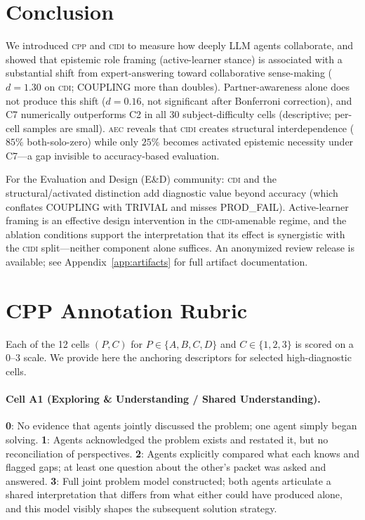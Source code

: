\documentclass{article}
\newcommand{\CDI}{\textsc{cdi}}
\newcommand{\CPP}{\textsc{cpp}}
\newcommand{\CIDI}{\textsc{cidi}}
\newcommand{\AEC}{\textsc{aec}}
\begin{document}
\section{Conclusion}
\label{sec:conclusion}

We introduced \CPP{} and \CIDI{} to measure how deeply LLM agents
collaborate, and showed that epistemic role framing (active-learner stance) is associated
with a substantial shift from expert-answering toward collaborative
sense-making ($d = 1.30$ on \CDI; COUPLING more than doubles). Partner-awareness
alone does not produce this shift ($d = 0.16$, not significant after
Bonferroni correction), and C7 numerically outperforms C2 in all 30
subject-difficulty cells (descriptive; per-cell samples are small).
\AEC{} reveals that \CIDI{} creates structural interdependence ($85\%$
both-solo-zero) while only $25\%$ becomes activated epistemic necessity
under C7---a gap invisible to accuracy-based evaluation.

For the Evaluation and Design (E\&D) community: \CDI{} and the structural/activated distinction add diagnostic value beyond accuracy (which conflates COUPLING with TRIVIAL and misses PROD\_FAIL). Active-learner framing is an effective design intervention in the \CIDI-amenable regime, and the ablation conditions support the interpretation that its effect is synergistic with the \CIDI{} split---neither component alone suffices.
An anonymized review release is available; see Appendix~\ref{app:artifacts} for full artifact documentation.

\clearpage



\appendix

\section{CPP Annotation Rubric}
\label{app:rubric}

Each of the 12 cells $(P, C)$ for $P \in \{A, B, C, D\}$ and
$C \in \{1, 2, 3\}$ is scored on a 0--3 scale. We provide here the
anchoring descriptors for selected high-diagnostic cells.

\paragraph{Cell A1 (Exploring \& Understanding / Shared Understanding).}
\textbf{0}: No evidence that agents jointly discussed the problem;
one agent simply began solving. \textbf{1}: Agents acknowledged the
problem exists and restated it, but no reconciliation of perspectives.
\textbf{2}: Agents explicitly compared what each knows and flagged
gaps; at least one question about the other's packet was asked and
answered. \textbf{3}: Full joint problem model constructed; both
agents articulate a shared interpretation that differs from what
either could have produced alone, and this model visibly shapes the
subsequent solution strategy.
\end{document}

